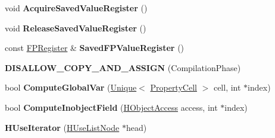\begin{DoxyCompactItemize}
\item 
void {\bfseries Acquire\+Saved\+Value\+Register} ()\hypertarget{classv8_1_1internal_1_1_b_a_s_e___e_m_b_e_d_d_e_d_abaa1fdbc4350df3b42d17e3fca6c4a33}{}\label{classv8_1_1internal_1_1_b_a_s_e___e_m_b_e_d_d_e_d_abaa1fdbc4350df3b42d17e3fca6c4a33}

\item 
void {\bfseries Release\+Saved\+Value\+Register} ()\hypertarget{classv8_1_1internal_1_1_b_a_s_e___e_m_b_e_d_d_e_d_abef4f55ab74b39d42811b1abe9b516af}{}\label{classv8_1_1internal_1_1_b_a_s_e___e_m_b_e_d_d_e_d_abef4f55ab74b39d42811b1abe9b516af}

\item 
const \hyperlink{structv8_1_1internal_1_1_f_p_register}{F\+P\+Register} \& {\bfseries Saved\+F\+P\+Value\+Register} ()\hypertarget{classv8_1_1internal_1_1_b_a_s_e___e_m_b_e_d_d_e_d_ace7e357745988ded2c7f4b226d09ea47}{}\label{classv8_1_1internal_1_1_b_a_s_e___e_m_b_e_d_d_e_d_ace7e357745988ded2c7f4b226d09ea47}

\item 
{\bfseries D\+I\+S\+A\+L\+L\+O\+W\+\_\+\+C\+O\+P\+Y\+\_\+\+A\+N\+D\+\_\+\+A\+S\+S\+I\+GN} (Compilation\+Phase)\hypertarget{classv8_1_1internal_1_1_b_a_s_e___e_m_b_e_d_d_e_d_a549667bef44f86f9cccf3c0e92ca0db6}{}\label{classv8_1_1internal_1_1_b_a_s_e___e_m_b_e_d_d_e_d_a549667bef44f86f9cccf3c0e92ca0db6}

\item 
bool {\bfseries Compute\+Global\+Var} (\hyperlink{classv8_1_1internal_1_1_unique}{Unique}$<$ \hyperlink{classv8_1_1internal_1_1_property_cell}{Property\+Cell} $>$ cell, int $\ast$index)\hypertarget{classv8_1_1internal_1_1_b_a_s_e___e_m_b_e_d_d_e_d_a520b590555316f49322c5ce2b1a00183}{}\label{classv8_1_1internal_1_1_b_a_s_e___e_m_b_e_d_d_e_d_a520b590555316f49322c5ce2b1a00183}

\item 
bool {\bfseries Compute\+Inobject\+Field} (\hyperlink{classv8_1_1internal_1_1_h_object_access}{H\+Object\+Access} access, int $\ast$index)\hypertarget{classv8_1_1internal_1_1_b_a_s_e___e_m_b_e_d_d_e_d_a54b489ca184796b991b8ef87f5d4b8d7}{}\label{classv8_1_1internal_1_1_b_a_s_e___e_m_b_e_d_d_e_d_a54b489ca184796b991b8ef87f5d4b8d7}

\item 
{\bfseries H\+Use\+Iterator} (\hyperlink{classv8_1_1internal_1_1_h_use_list_node}{H\+Use\+List\+Node} $\ast$head)\hypertarget{classv8_1_1internal_1_1_b_a_s_e___e_m_b_e_d_d_e_d_a2815bee97f25bb2476d306b1cda48d32}{}\label{classv8_1_1internal_1_1_b_a_s_e___e_m_b_e_d_d_e_d_a2815bee97f25bb2476d306b1cda48d32}


\end{DoxyCompactItemize}
